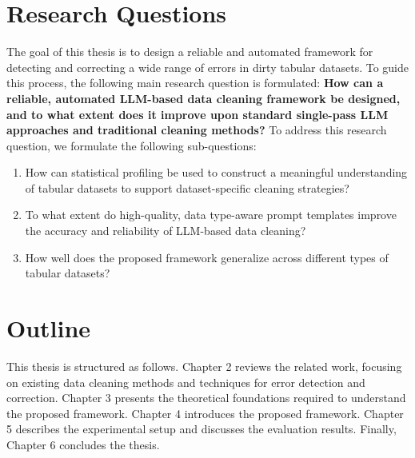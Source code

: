 \section{Research Questions}
The goal of this thesis is to design a reliable and automated framework for detecting and correcting a wide range of errors in dirty tabular datasets.
To guide this process, the following main research question is formulated:
\newline\newline
\textbf{How can a reliable, automated LLM-based data cleaning framework be designed, and to what extent does it improve upon standard single-pass LLM approaches and traditional cleaning methods?}
\newline\newline
To address this research question, we formulate the following sub-questions:
\begin{enumerate}
    \item How can statistical profiling be used to construct a meaningful understanding of tabular datasets to support dataset-specific cleaning strategies?
    \item To what extent do high-quality, data type-aware prompt templates improve the accuracy and reliability of LLM-based data cleaning?
    \item How well does the proposed framework generalize across different types of tabular datasets?
\end{enumerate}

\section{Outline}
This thesis is structured as follows. 
Chapter 2 reviews the related work, focusing on existing data cleaning methods and techniques for error detection and correction. 
Chapter 3 presents the theoretical foundations required to understand the proposed framework. 
Chapter 4 introduces the proposed framework. 
Chapter 5 describes the experimental setup and discusses the evaluation results. 
Finally, Chapter 6 concludes the thesis.
